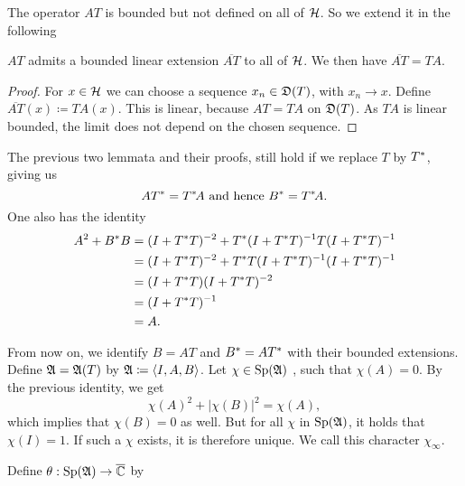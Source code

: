 The operator $AT$ is bounded but not defined on all of $\mathcal{H}$. So we extend it
in the following

\begin{lem}
 $AT$ admits a bounded linear extension $\overline{AT}$ to all of $\mathcal{H}$. 
 We then have $\overline{AT}=TA$.
\end{lem}

\begin{proof}
 For $x \in \mathcal{H}$ we can choose a sequence $x_n \in \mathfrak{D}(T)$, with 
 $x_n \rightarrow x$. Define $\overline{AT}(x) \coloneqq TA(x)$.
 This is linear, because $AT = TA$ on $\mathfrak{D}(T)$. As $TA$ is linear bounded,
 the limit does not depend on the chosen sequence.
\end{proof}

\begin{rem}
 The previous two lemmata and their proofs, still hold if we replace $T$ by $T^{*}$,
 giving us 
 \[
  AT^{*} = T^{*} \! A \text{ and hence } B^{*} = T^{*} \! A.
 \]
 One also has the identity
 \begin{align*}
  A^2 + B^{*} B &= (I + T^{*} T)^{-2} + T ^{*} (I + T^{*} T)
		    ^{-1} T (I + T^{*} T) ^{-1} \\
		&= (I + T^{*} T)^{-2} + T ^{*} T(I + T^{*} T)
		   ^{-1} (I + T^{*} T) ^{-1} \\
		&= (I + T^{*} T)(I + T^{*} T)^{-2} \\
		&= (I + T^{*} T)^{-1}  \\
		&= A .
  \end{align*}

  

\end{rem}

From now on, we identify $B={AT}$ and $B^{*} ={AT^{*}}$
with their bounded extensions.
Define $\mathfrak{A} = \mathfrak{A}(T)$ by $\mathfrak{A} \coloneqq  \left\langle I, A, B  \right\rangle$. Let $ \chi \in \operatorname{Sp} (\mathfrak{A})$
, such that $\chi(A) =0$. By the previous identity, we get
\[
 \chi(A)^2 + |\chi(B)|^2 = \chi(A),
\]
which implies that $\chi(B) =0$ as well. But for all $\chi$ in  $\operatorname{Sp} (\mathfrak{A})$, 
 it holds that $\chi(I)=1$.
If such a $\chi$ exists, it is therefore unique. We call this
character $\chi_\infty$.

Define $\theta : \operatorname{Sp} (\mathfrak{A}) \to {\overline{\mathbb{C}}}$ by

